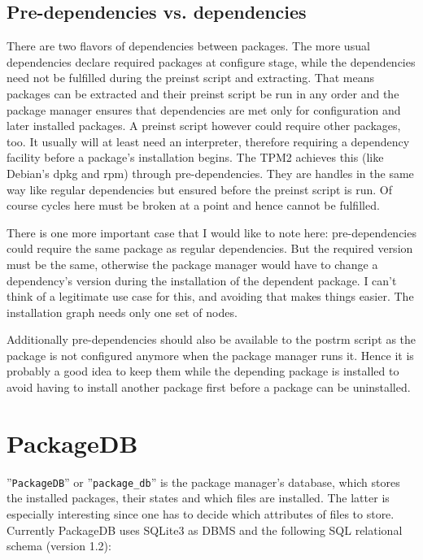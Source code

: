 \documentclass[a4paper]{scrartcl}
\newcommand{\module}[1]{\texttt{#1}}
\begin{document}
	\subsection{Pre-dependencies vs. dependencies}
	\label{sec:pre_dependencies_vs_dependencies}
	
	There are two flavors of dependencies between packages. The more usual dependencies declare required packages at configure stage, while the dependencies need not be fulfilled during the preinst script and extracting. That means packages can be extracted and their preinst script be run in any order and the package manager ensures that dependencies are met only for configuration and later installed packages. A preinst script however could require other packages, too. It usually will at least need an interpreter, therefore requiring a dependency facility before a package's installation begins. The TPM2 achieves this (like Debian's dpkg and rpm) through pre-dependencies. They are handles in the same way like regular dependencies but ensured before the preinst script is run. Of course cycles here must be broken at a point and hence cannot be fulfilled.
	
	There is one more important case that I would like to note here: pre-dependencies could require the same package as regular dependencies. But the required version must be the same, otherwise the package manager would have to change a dependency's version during the installation of the dependent package. I can't think of a legitimate use case for this, and avoiding that makes things easier. The installation graph needs only one set of nodes.
	
	Additionally pre-dependencies should also be available to the postrm script as the package is not configured anymore when the package manager runs it. Hence it is probably a good idea to keep them while the depending package is installed to avoid having to install another package first before a package can be uninstalled.
	
	
	\section{PackageDB}
	\label{sec:packagedb}
	
	''\module{PackageDB}'' or ''\module{package\_db}'' is the package manager's database, which stores the installed packages, their states and which files are installed. The latter is especially interesting since one has to decide which attributes of files to store. Currently PackageDB uses SQLite3 as DBMS and the following SQL relational schema (version 1.2):
	
\end{document}
